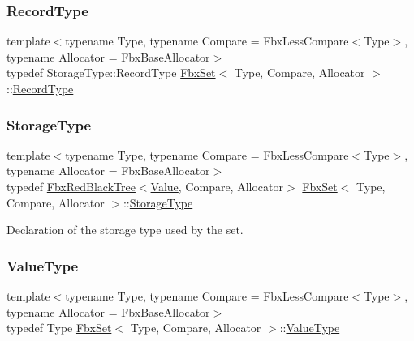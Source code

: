 \mbox{\label{class_fbx_set_aa3934cd434a09288204f5e6c99b9cd01}} 
\subsubsection{\texorpdfstring{Record\+Type}{RecordType}}
{\footnotesize\ttfamily template$<$typename Type, typename Compare = Fbx\+Less\+Compare$<$\+Type$>$, typename Allocator = Fbx\+Base\+Allocator$>$ \\
typedef Storage\+Type\+::\+Record\+Type \hyperlink{class_fbx_set}{Fbx\+Set}$<$ Type, Compare, Allocator $>$\+::\hyperlink{class_fbx_set_aa3934cd434a09288204f5e6c99b9cd01}{Record\+Type}}

\mbox{\label{class_fbx_set_a6d908b9bc11d5418cd2fcceda1342e90}} 
\subsubsection{\texorpdfstring{Storage\+Type}{StorageType}}
{\footnotesize\ttfamily template$<$typename Type, typename Compare = Fbx\+Less\+Compare$<$\+Type$>$, typename Allocator = Fbx\+Base\+Allocator$>$ \\
typedef \hyperlink{class_fbx_red_black_tree}{Fbx\+Red\+Black\+Tree}$<$\hyperlink{class_fbx_set_1_1_value}{Value}, Compare, Allocator$>$ \hyperlink{class_fbx_set}{Fbx\+Set}$<$ Type, Compare, Allocator $>$\+::\hyperlink{class_fbx_set_a6d908b9bc11d5418cd2fcceda1342e90}{Storage\+Type}\hspace{0.3cm}{\ttfamily [protected]}}



Declaration of the storage type used by the set. 

\mbox{\label{class_fbx_set_abb0f1b628634e07825532526e2e92baf}} 
\subsubsection{\texorpdfstring{Value\+Type}{ValueType}}
{\footnotesize\ttfamily template$<$typename Type, typename Compare = Fbx\+Less\+Compare$<$\+Type$>$, typename Allocator = Fbx\+Base\+Allocator$>$ \\
typedef Type \hyperlink{class_fbx_set}{Fbx\+Set}$<$ Type, Compare, Allocator $>$\+::\hyperlink{class_fbx_set_abb0f1b628634e07825532526e2e92baf}{Value\+Type}}



